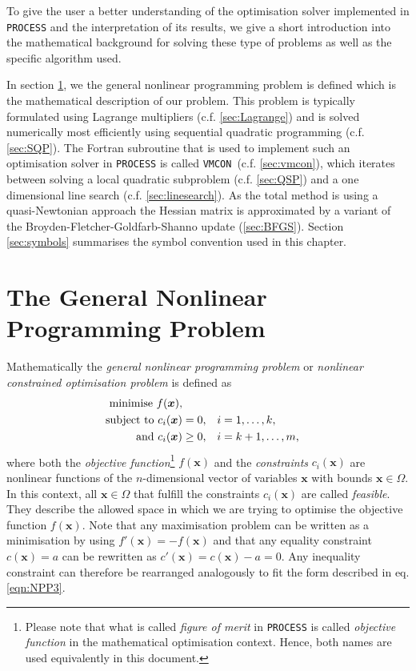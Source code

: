 \documentclass[11pt,a4paper]{report}
\newcommand{\process}{\mbox{\texttt{PROCESS}}}
\newcommand{\vmcon}{\mbox{\texttt{VMCON}}}
\renewcommand{\vec}[1]{\boldsymbol{#1}}
\begin{document}
\newcommand{\exithigher}[2]{%
  \path (#1.east)+(+5.,0.25) node (urtmp)[urred] {i\texttt{fail} = #2};
  \path [line] (#1.east)+(0.0,0.25) -- node [above]
    {} (urtmp);}


\label{app:Opt}

To give the user a better understanding of the optimisation solver implemented
in \process\/ and the interpretation of its results, we give a short
introduction into the mathematical background for solving these type of
problems as well as the specific algorithm used.

In section \ref{sec:GNPP}, we the general nonlinear programming problem is
defined which is the mathematical description of our problem. This problem is
typically formulated using Lagrange multipliers (c.f. \ref{sec:Lagrange}) and
is solved numerically most efficiently using sequential quadratic programming
(c.f. \ref{sec:SQP}). The Fortran subroutine that is used to implement such an
optimisation solver in \process\/ is called \vmcon\ (c.f. \ref{sec:vmcon}),
which iterates between solving a local quadratic subproblem
(c.f. \ref{sec:QSP}) and a one dimensional line search
(c.f. \ref{sec:linesearch}). As the total method is using a quasi-Newtonian
approach the Hessian matrix is approximated by a variant of the
Broyden-Fletcher-Goldfarb-Shanno update (\ref{sec:BFGS}). Section
\ref{sec:symbols} summarises the symbol convention used in this chapter.


\section{The General Nonlinear Programming Problem}
\label{sec:GNPP}
Mathematically the {\it general nonlinear programming problem} or {\it
  nonlinear constrained optimisation problem} is defined as
\begin{subequations}
\label{eqn:NPP}
\begin{align}
\textnormal{minimise } f(\vec{x}), & \\
\textnormal{subject to } c_i(\vec{x}) &= 0, & i&=1,\dots,k,\\
\label{eqn:NPP3}
\textnormal{and } c_i(\vec{x}) &\geq 0, & i&=k+1,\dots,m,
\end{align}
\end{subequations}
where both the {\it objective function}\footnote{Please note that what is
  called {\it figure of merit} in \process\/ is called {\it objective
    function} in the mathematical optimisation context. Hence, both names are
  used equivalently in this document.} $f(\vec{x})$ and the {\it constraints}
$c_i(\vec{x})$ are nonlinear functions of the $n$-dimensional vector of
variables $\vec{x}$ with bounds $\vec{x} \in \Omega$. In this context, all
$\vec{x}\in\Omega$ that fulfill the constraints $c_i(\vec{x})$ are called {\it
  feasible}. They describe the allowed space in which we are trying to
optimise the objective function $f(\vec{x})$. Note that any maximisation
problem can be written as a minimisation by using $f'(\vec{x}) = - f(\vec{x})$
and that any equality constraint $c(\vec{x}) = a$ can be rewritten as
$c'(\vec{x}) = c(\vec{x}) - a = 0$. Any inequality constraint can therefore be
rearranged analogously to fit the form described in eq. \ref{eqn:NPP3}.
\end{document}

